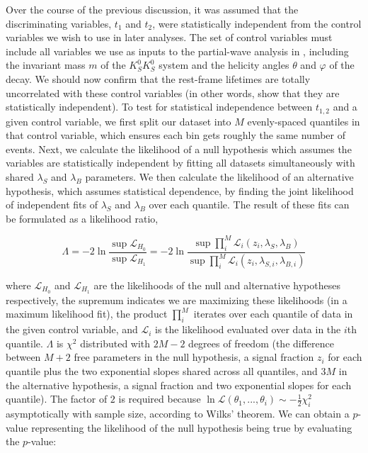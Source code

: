 Over the course of the previous discussion, it was assumed that the discriminating variables, $t_1$ and $t_2$, were statistically independent from the control variables we wish to use in later analyses. The set of control variables must include all variables we use as inputs to the partial-wave analysis in , including the invariant mass $m$ of the $K_S^0K_S^0$ system and the helicity angles $\theta$ and $\varphi$ of the decay. We should now confirm that the rest-frame lifetimes are totally uncorrelated with these control variables (in other words, show that they are statistically independent). To test for statistical independence between $t_{1,2}$ and a given control variable, we first split our dataset into $M$ evenly-spaced quantiles in that control variable, which ensures each bin gets roughly the same number of events. Next, we calculate the likelihood of a null hypothesis which assumes the variables are statistically independent by fitting all datasets simultaneously with shared $\lambda_S$ and $\lambda_B$ parameters. We then calculate the likelihood of an alternative hypothesis, which assumes statistical dependence, by finding the joint likelihood of independent fits of $\lambda_S$ and $\lambda_B$ over each quantile. The result of these fits can be formulated as a likelihood ratio,

\begin{equation}
  \Lambda = -2\ln\frac{\sup \mathcal{L}_{H_0}}{\sup \mathcal{L}_{H_1}} = -2\ln\frac{\sup \prod_i^M \mathcal{L}_i(z_i, \lambda_S, \lambda_B)}{\sup \prod_i^M \mathcal{L}_i(z_i, \lambda_{S,i}, \lambda_{B,i})}
  \label{eq:independence-test}
\end{equation}

where $\mathcal{L}_{H_0}$ and $\mathcal{L}_{H_1}$ are the likelihoods of the null and alternative hypotheses respectively, the supremum indicates we are maximizing these likelihoods (in a maximum likelihood fit), the product $\prod_i^M$ iterates over each quantile of data in the given control variable, and $\mathcal{L}_i$ is the likelihood evaluated over data in the $i$th quantile. $\Lambda$ is $\chi^2$ distributed with $2M - 2$ degrees of freedom (the difference between $M + 2$ free parameters in the null hypothesis, a signal fraction $z_i$ for each quantile plus the two exponential slopes shared across all quantiles, and $3M$ in the alternative hypothesis, a signal fraction and two exponential slopes for each quantile). The factor of $2$ is required because $\ln\mathcal{L}(\theta_1,...,\theta_i) \sim -\frac{1}{2}\chi^2_i$ asymptotically with sample size, according to Wilks' theorem. We can obtain a $p$-value representing the likelihood of the null hypothesis being true by evaluating the $p$-value:

